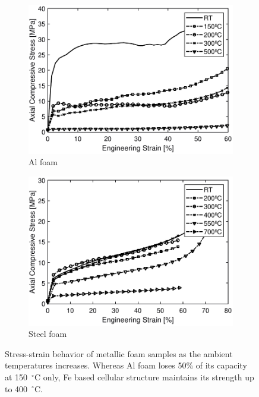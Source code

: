 \documentclass[review]{elsarticle}
\begin{document}
\begin{figure}
	\centering
	\begin{subfigure}{.5\textwidth}
		\centering
		\includegraphics[width=0.98\linewidth]{Tex-Figures/Fig08a.pdf}
		\caption{Al foam}
		\label{fig8:sub1}
	\end{subfigure}%
	\begin{subfigure}{.5\textwidth}
		\centering
		\includegraphics[width=0.98\linewidth]{Tex-Figures/Fig08b.pdf}
		\caption{Steel foam}
		\label{fig8:sub2}
	\end{subfigure}
	\caption{Stress-strain behavior of metallic foam samples as the ambient temperatures increases. Whereas Al foam loses 50\% of its capacity at 150~$^{\circ}\mathrm{C}$ only, Fe based cellular structure maintains its strength up to 400~$^{\circ}\mathrm{C}$.}
	\label{fig:FoamStrStr}
\end{figure}
\end{document}
